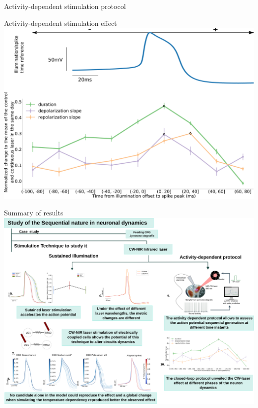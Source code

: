 \documentclass[aspectratio=43]{beamer}
\begin{document}
\begin{frame}{Activity-dependent stimulation protocol}
{	}
\end{frame}

\begin{frame}{Activity-dependent stimulation effect}
	\centering
	\includegraphics[width=\textwidth]{Images/activity-dependent results.png}
\end{frame}

\begin{frame}{Summary of results}
	\centering
	\includegraphics[width=\textwidth]{Images/laser_summary.png}
\end{frame}
\end{document}
